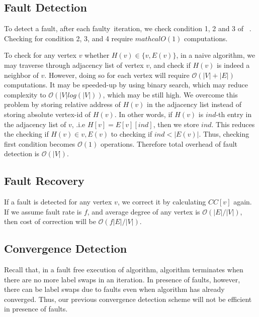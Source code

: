 
\subsection{Fault Detection}
To detect a fault, after each faulty~\sv iteration, we check condition 1, 2 and 3 of ~. Checking for condition 2, 3, and 4 require $mathcal{O}(1)$ computations. 

 To check for any vertex $v$ whether $H(v) \in \{ v, E(v)\}$, in a naive algorithm, 
we may traverse through adjacency list of vertex $v$, and check if $H(v)$ is indeed a neighbor of $v$. However, doing so for each vertex will require $\mathcal{O}(|V|+|E|)$ computations. It may be speeded-up by using binary search, which may reduce complexity to $\mathcal{O}(|V|log(|V|))$, which may be still high. 
We  overcome this problem by storing relative address of $H(v)$ in the adjacency list instead of storing absolute vertex-id of $H(v)$.
 In other words, if $H(v)$ is $ind$-th entry in the adjacency list of $v$, .i.e $H[v]=E[v][ind]$, 
 then we store $ind$. This reduces the checking if $H(v)\in{v,E(v)}$ to checking if $ind<|E(v)|$.  Thus, checking first condition becomes $\mathcal{O}(1)$ operations. 
 Therefore total overhead of fault detection is  $\mathcal{O}(|V|)$.

\subsection{Fault Recovery}
If a fault is detected for any vertex $v$, we correct it by calculating $CC[v]$ again. 
If we assume fault rate is $f$, and average degree of any vertex is $\mathcal{O}(|E|/|V|)$, 
then cost of correction will be $\mathcal{O}(f|E|/|V|)$.

\subsection{Convergence Detection}
Recall that, in a fault free execution of \sv algorithm, algorithm terminates when there
are no more label swaps in an iteration. In presence of faults, however, there can be label
swaps due to faults even when algorithm has already converged. Thus, our previous 
convergence detection scheme will not be efficient in presence of faults. 

